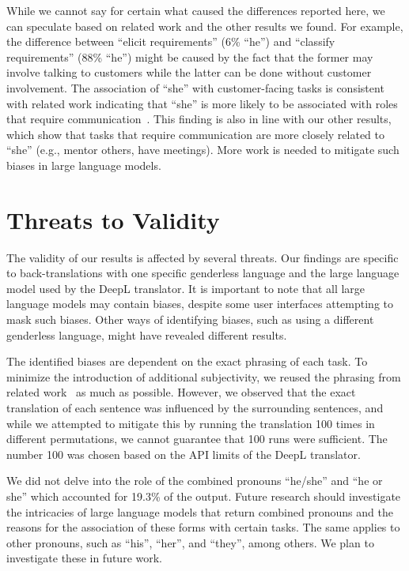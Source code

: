 \documentclass[10pt,conference]{IEEEtran}
\begin{document}
\begin{sloppy}
While we cannot say for certain what caused the differences reported here, we can speculate based on related work and the other results we found. For example, the difference between ``elicit requirements'' (6\% ``he'') and ``classify requirements'' (88\% ``he'') might be caused by the fact that the former may involve talking to customers while the latter can be done without customer involvement. The association of ``she'' with customer-facing tasks is consistent with related work indicating that ``she'' is more likely to be associated with roles that require communication~\cite{fishman1997interaction}. This finding is also in line with our other results, which show that tasks that require communication are more closely related to ``she'' (e.g., mentor others, have meetings). More work is needed to mitigate such biases in large language models.

\section{Threats to Validity}

The validity of our results is affected by several threats. Our findings are specific to back-translations with one specific genderless language and the large language model used by the DeepL translator. It is important to note that all large language models may contain biases, despite some user interfaces attempting to mask such biases. Other ways of identifying biases, such as using a different genderless language, might have revealed different results.

The identified biases are dependent on the exact phrasing of each task. To minimize the introduction of additional subjectivity, we reused the phrasing from related work~\cite{masood2022like} as much as possible. However, we observed that the exact translation of each sentence was influenced by the surrounding sentences, and while we attempted to mitigate this by running the translation 100 times in different permutations, we cannot guarantee that 100 runs were sufficient. The number 100 was chosen based on the API limits of the DeepL translator.

We did not delve into the role of the combined pronouns ``he/she'' and ``he or she'' which accounted for 19.3\% of the output. Future research should investigate the intricacies of large language models that return combined pronouns and the reasons for the association of these forms with certain tasks. The same applies to other pronouns, such as ``his'', ``her'', and ``they'', among others. We plan to investigate these in future work.


\end{sloppy}
\end{document}
